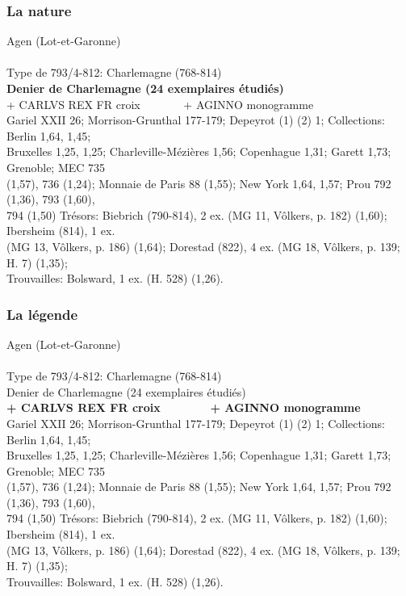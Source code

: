 \documentclass[10pt, compress]{beamer}
\begin{document}
\begin{frame}[fragile]
  \frametitle{La nature}
  \begin{scriptsize}
\textcolor{light_gray}{Agen (Lot-et-Garonne)}\\~\\

\textcolor{light_gray}{Type de 793/4-812: Charlemagne (768-814)}\\

\textbf{Denier de Charlemagne (24 exemplaires étudiés)}\\
\textcolor{light_gray}{
+ CARLVS REX FR croix~~~~~~~ + AGINNO monogramme\\
Gariel XXII 26; Morrison-Grunthal 177-179; Depeyrot (1) (2) 1; Collections: Berlin 1,64, 1,45; \\
Bruxelles 1,25, 1,25; Charleville-Mézières 1,56; Copenhague 1,31; Garett 1,73; Grenoble; MEC 735 \\
(1,57), 736 (1,24); Monnaie de Paris 88 (1,55); New York 1,64, 1,57; Prou 792 (1,36), 793 (1,60), \\
794 (1,50) Trésors: Biebrich (790-814), 2 ex. (MG 11, Vôlkers, p. 182) (1,60); Ibersheim (814), 1 ex. \\
(MG 13, Vôlkers, p. 186) (1,64); Dorestad (822), 4 ex. (MG 18, Vôlkers, p. 139; H. 7) (1,35); \\Trouvailles: Bolsward, 1 ex. (H. 528) (1,26).
} 
    \end{scriptsize}
\end{frame}

\begin{frame}[fragile]
  \frametitle{La légende}
  \begin{scriptsize}
\textcolor{light_gray}{Agen (Lot-et-Garonne)}\\~\\

\textcolor{light_gray}{Type de 793/4-812: Charlemagne (768-814)\\
Denier de Charlemagne (24 exemplaires étudiés)}\\

\textbf{+ CARLVS REX FR croix~~~~~~~ + AGINNO monogramme}\\
\textcolor{light_gray}{
Gariel XXII 26; Morrison-Grunthal 177-179; Depeyrot (1) (2) 1; Collections: Berlin 1,64, 1,45; \\
Bruxelles 1,25, 1,25; Charleville-Mézières 1,56; Copenhague 1,31; Garett 1,73; Grenoble; MEC 735 \\
(1,57), 736 (1,24); Monnaie de Paris 88 (1,55); New York 1,64, 1,57; Prou 792 (1,36), 793 (1,60), \\
794 (1,50) Trésors: Biebrich (790-814), 2 ex. (MG 11, Vôlkers, p. 182) (1,60); Ibersheim (814), 1 ex. \\
(MG 13, Vôlkers, p. 186) (1,64); Dorestad (822), 4 ex. (MG 18, Vôlkers, p. 139; H. 7) (1,35); \\
Trouvailles: Bolsward, 1 ex. (H. 528) (1,26).
} 
    \end{scriptsize}
\end{frame}
\end{document}
